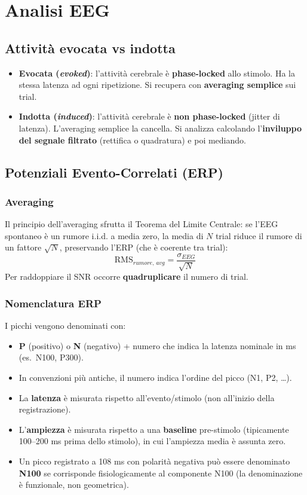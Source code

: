 \section{Analisi EEG}

\subsection{Attività evocata vs indotta}

\begin{itemize}
    \item \textbf{Evocata (\textit{evoked})}: l'attività cerebrale è \textbf{phase-locked} allo stimolo. Ha la stessa latenza ad ogni ripetizione. Si recupera con \textbf{averaging semplice} sui trial.
    \item \textbf{Indotta (\textit{induced})}: l'attività cerebrale è \textbf{non phase-locked} (jitter di latenza). L'averaging semplice la cancella. Si analizza calcolando l'\textbf{inviluppo del segnale filtrato} (rettifica o quadratura) e poi mediando.
\end{itemize}

\subsection{Potenziali Evento-Correlati (ERP)}

\subsubsection{Averaging}

Il principio dell'averaging sfrutta il Teorema del Limite Centrale: se l'EEG spontaneo è un rumore i.i.d. a media zero, la media di $N$ trial riduce il rumore di un fattore $\sqrt{N}$, preservando l'ERP (che è coerente tra trial):
\[
\text{RMS}_{rumore,\, avg} = \frac{\sigma_{EEG}}{\sqrt{N}}
\]
Per raddoppiare il SNR occorre \textbf{quadruplicare} il numero di trial.

\subsubsection{Nomenclatura ERP}

I picchi vengono denominati con:
\begin{itemize}
    \item \textbf{P} (positivo) o \textbf{N} (negativo) + numero che indica la latenza nominale in ms (es.\ N100, P300).
    \item In convenzioni più antiche, il numero indica l'ordine del picco (N1, P2, \ldots).
    \item La \textbf{latenza} è misurata rispetto all'evento/stimolo (non all'inizio della registrazione).
    \item L'\textbf{ampiezza} è misurata rispetto a una \textbf{baseline} pre-stimolo (tipicamente 100--200 ms prima dello stimolo), in cui l'ampiezza media è assunta zero.
    \item Un picco registrato a 108 ms con polarità negativa può essere denominato \textbf{N100} se corrisponde fisiologicamente al componente N100 (la denominazione è funzionale, non geometrica).
\end{itemize}


